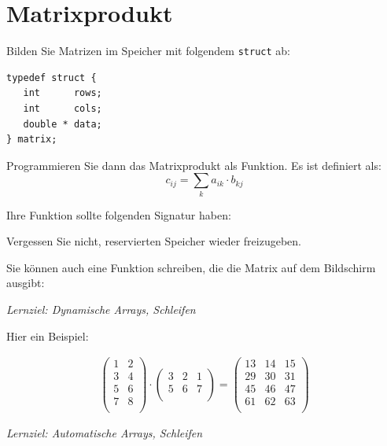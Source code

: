 \documentclass[
	ngerman,
	fontsize=10pt,
	parskip=half,
	titlepage=true,
	DIV=12
]{scrartcl}
\begin{document}
\section{Matrixprodukt}
Bilden Sie Matrizen im Speicher mit folgendem \texttt{struct} ab:
\begin{verbatim}
typedef struct {
   int      rows;
   int      cols;
   double * data;
} matrix;
\end{verbatim}

Programmieren Sie dann das Matrixprodukt als Funktion. Es ist definiert als:
\[ c_{ij} = \sum_k a_{ik} \cdot b_{kj} \]

Ihre Funktion sollte folgenden Signatur haben:

Vergessen Sie nicht, reservierten Speicher wieder freizugeben.

Sie können auch eine Funktion schreiben, die die Matrix auf dem Bildschirm ausgibt:

\emph{Lernziel: Dynamische Arrays, Schleifen}

Hier ein Beispiel:

\begin{gather*}
\begin{pmatrix}
1& 2\\
3& 4\\
5& 6\\
7& 8\\
\end{pmatrix}
\cdot
\begin{pmatrix}
3& 2& 1\\
5& 6& 7\\
\end{pmatrix}
=
\begin{pmatrix}
13& 14& 15\\
29& 30& 31\\
45& 46& 47\\
61& 62& 63\\
\end{pmatrix}
\end{gather*}

{\em Lernziel: Automatische Arrays, Schleifen}
\end{document}
